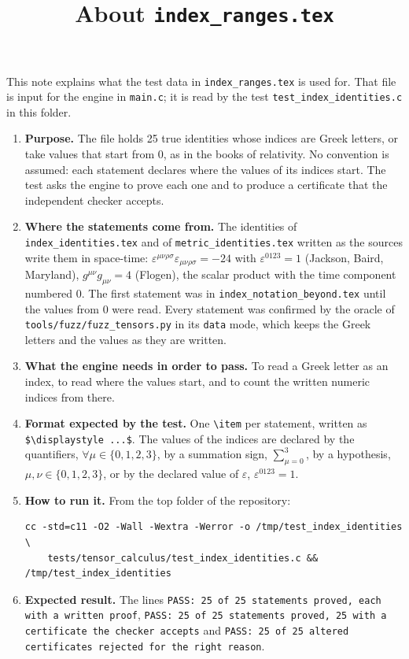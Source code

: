 \documentclass[11pt,a4paper]{article}
\title{About \texttt{index\_ranges.tex}}
\author{}
\date{}
\begin{document}
\maketitle
This note explains what the test data in \texttt{index\_ranges.tex} is used for. That file is input for the engine in \texttt{main.c}; it is read by the test \texttt{test\_index\_identities.c} in this folder.

\begin{enumerate}
\item \textbf{Purpose.} The file holds 25 true identities whose indices are Greek letters, or take values that start from 0, as in the books of relativity. No convention is assumed: each statement declares where the values of its indices start. The test asks the engine to prove each one and to produce a certificate that the independent checker accepts.

\item \textbf{Where the statements come from.} The identities of \texttt{index\_identities.tex} and of \texttt{metric\_identities.tex} written as the sources write them in space-time: $\varepsilon^{\mu\nu\rho\sigma}\varepsilon_{\mu\nu\rho\sigma} = -24$ with $\varepsilon^{0123} = 1$ (Jackson, Baird, Maryland), $g^{\mu\nu} g_{\mu\nu} = 4$ (Flogen), the scalar product with the time component numbered 0. The first statement was in \texttt{index\_notation\_beyond.tex} until the values from 0 were read. Every statement was confirmed by the oracle of \texttt{tools/fuzz/fuzz\_tensors.py} in its \texttt{data} mode, which keeps the Greek letters and the values as they are written.

\item \textbf{What the engine needs in order to pass.} To read a Greek letter as an index, to read where the values start, and to count the written numeric indices from there.

\item \textbf{Format expected by the test.} One \texttt{\textbackslash item} per statement, written as \texttt{\$\textbackslash displaystyle ...\$}. The values of the indices are declared by the quantifiers, $\forall \mu \in \{0, 1, 2, 3\}$, by a summation sign, $\sum_{\mu=0}^{3}$, by a hypothesis, $\mu, \nu \in \{0, 1, 2, 3\}$, or by the declared value of $\varepsilon$, $\varepsilon^{0123} = 1$.

\item \textbf{How to run it.} From the top folder of the repository:
\begin{verbatim}
cc -std=c11 -O2 -Wall -Wextra -Werror -o /tmp/test_index_identities \
    tests/tensor_calculus/test_index_identities.c && /tmp/test_index_identities
\end{verbatim}

\item \textbf{Expected result.} The lines \texttt{PASS: 25 of 25 statements proved, each with a written proof}, \texttt{PASS: 25 of 25 statements proved, 25 with a certificate the checker accepts} and \texttt{PASS: 25 of 25 altered certificates rejected for the right reason}.

\end{enumerate}
\end{document}
